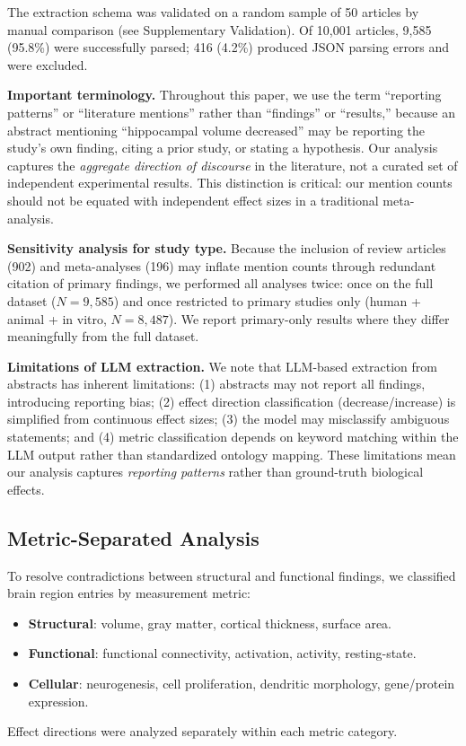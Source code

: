 \documentclass[12pt,a4paper]{article}
\begin{document}
The extraction schema was validated on a random sample of 50 articles by manual comparison (see Supplementary Validation). Of 10,001 articles, 9,585 (95.8\%) were successfully parsed; 416 (4.2\%) produced JSON parsing errors and were excluded.

\textbf{Important terminology.} Throughout this paper, we use the term ``reporting patterns'' or ``literature mentions'' rather than ``findings'' or ``results,'' because an abstract mentioning ``hippocampal volume decreased'' may be reporting the study's own finding, citing a prior study, or stating a hypothesis. Our analysis captures the \textit{aggregate direction of discourse} in the literature, not a curated set of independent experimental results. This distinction is critical: our mention counts should not be equated with independent effect sizes in a traditional meta-analysis.

\textbf{Sensitivity analysis for study type.} Because the inclusion of review articles (902) and meta-analyses (196) may inflate mention counts through redundant citation of primary findings, we performed all analyses twice: once on the full dataset ($N = 9{,}585$) and once restricted to primary studies only (human + animal + in vitro, $N = 8{,}487$). We report primary-only results where they differ meaningfully from the full dataset.

\textbf{Limitations of LLM extraction.} We note that LLM-based extraction from abstracts has inherent limitations: (1) abstracts may not report all findings, introducing reporting bias; (2) effect direction classification (decrease/increase) is simplified from continuous effect sizes; (3) the model may misclassify ambiguous statements; and (4) metric classification depends on keyword matching within the LLM output rather than standardized ontology mapping. These limitations mean our analysis captures \textit{reporting patterns} rather than ground-truth biological effects.

\subsection{Metric-Separated Analysis}

To resolve contradictions between structural and functional findings, we classified brain region entries by measurement metric:
\begin{itemize}
    \item \textbf{Structural}: volume, gray matter, cortical thickness, surface area.
    \item \textbf{Functional}: functional connectivity, activation, activity, resting-state.
    \item \textbf{Cellular}: neurogenesis, cell proliferation, dendritic morphology, gene/protein expression.
\end{itemize}
Effect directions were analyzed separately within each metric category.
\end{document}
